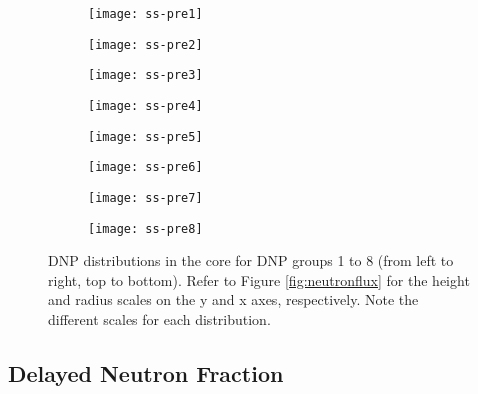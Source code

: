 \begin{figure}[t!]
    \centering
    \begin{subfigure}[t]{.243\textwidth}
        \centering
        \texttt{[image: ss-pre1]}
    \end{subfigure}
    \begin{subfigure}[t]{.243\textwidth}
        \centering
        \texttt{[image: ss-pre2]}
    \end{subfigure}
    \begin{subfigure}[t]{.243\textwidth}
        \centering
        \texttt{[image: ss-pre3]}
    \end{subfigure}
    \begin{subfigure}[t]{.243\textwidth}
        \centering
        \texttt{[image: ss-pre4]}
    \end{subfigure}
    \begin{subfigure}[t]{.243\textwidth}
        \centering
        \texttt{[image: ss-pre5]}
    \end{subfigure}
    \begin{subfigure}[t]{.243\textwidth}
        \centering
        \texttt{[image: ss-pre6]}
    \end{subfigure}
    \begin{subfigure}[t]{.243\textwidth}
        \centering
        \texttt{[image: ss-pre7]}
    \end{subfigure}
    \begin{subfigure}[t]{.243\textwidth}
        \centering
        \texttt{[image: ss-pre8]}
    \end{subfigure}
    \caption{\gls{DNP} distributions in the core for \gls{DNP} groups
    1 to 8 (from left to right, top to bottom). Refer to Figure \ref{fig:neutronflux} for the height and radius
    scales on the y and x axes, respectively. Note the different scales for
    each distribution.}
    \label{fig:dnp}
\end{figure}

\subsection{Delayed Neutron Fraction}

